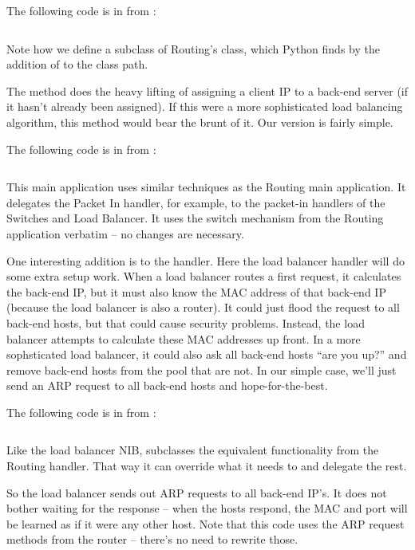 The following code is in from :

\inputminted{python}{code/routing_variants/load_balancer_nib.py}

Note how we define a subclass of Routing's  class, which
Python finds by the addition of  to the class path.    

The method  does the heavy lifting of assigning a client IP to a back-end
server (if it hasn't already been assigned).  If this were a more sophisticated load balancing
algorithm, this method would bear the brunt of it.  Our version is fairly simple.

The following code is in from 
:

\inputminted{python}{code/routing_variants/load_balancer1.py}

This main application uses similar techniques as the Routing main application.  It delegates
the Packet In handler, for example, to the packet-in handlers of the Switches and Load Balancer.
It uses the switch mechanism from the Routing application verbatim -- no changes are
necessary.  

One interesting addition is to the  handler.  Here the load balancer
handler will do some extra setup work.  When a load balancer routes a first request, it 
calculates the back-end IP, but it must also know the MAC address of that back-end IP 
(because the load balancer is also a router).  It could just flood the request to all
back-end hosts, but that could cause security problems.  Instead, the load balancer attempts
to calculate these MAC addresses up front.  In a more sophsticated load balancer, it could
also ask all back-end hosts ``are you up?'' and remove back-end hosts from the pool that are not.
In our simple case, we'll just send an ARP request to all back-end hosts and hope-for-the-best.

The following code is in from 
:

\inputminted[lastline=17]{python}{code/routing_variants/load_balancer_handler.py} 

Like the load balancer NIB,  subclasses the equivalent functionality
from the Routing handler.  That way it can override what it needs to and delegate the rest.

So the load balancer sends out ARP requests to all back-end IP's.  It does not bother 
waiting for the response -- when the hosts respond, the MAC and port will be learned as if it
were any other host.  Note that this code uses the ARP request methods from the router -- there's
no need to rewrite those.


